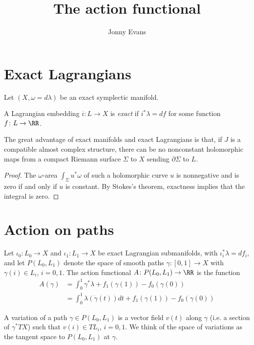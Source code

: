 \documentclass{amsart}
\title{The action functional}
\author{Jonny Evans}
\begin{document}
\section{Exact Lagrangians}

Let $(X,\omega=d\lambda)$ be an exact symplectic manifold.

\begin{Definition}
A Lagrangian embedding $i\colon L\to X$ is {\em exact} if $i^*\lambda=df$ for some function $f\colon L\to\RR$.
\end{Definition}

\begin{Remark}[stokes]
The great advantage of exact manifolds and exact Lagrangians is that, if $J$ is a compatible almost complex structure, there can be no nonconstant holomorphic maps from a compact Riemann surface $\Sigma$ to $X$ sending $\partial\Sigma$ to $L$.
\end{Remark}
\begin{proof}
The $\omega$-area $\int_{\Sigma} u^*\omega$ of such a holomorphic curve $u$ is nonnegative and is zero if and only if $u$ is constant. By Stokes's theorem, exactness implies that the integral is zero.
\end{proof}

\section{Action on paths}

\begin{Definition}
Let $\iota_0\colon L_0\to X$ and $\iota_1\colon L_1\to X$ be exact Lagrangian submanifolds, with $\iota_i^*\lambda=df_i$, and let $P(L_0,L_1)$ denote the space of smooth paths $\gamma\colon[0,1]\to X$ with $\gamma(i)\in L_i$, $i=0,1$. The action functional $A\colon P(L_0,L_1)\to\RR$ is the function
\begin{align*}
A(\gamma)&=\int_0^1\gamma^*\lambda+f_1(\gamma(1))-f_0(\gamma(0))\\
&=\int_0^1\lambda(\dot{\gamma}(t))dt+f_1(\gamma(1))-f_0(\gamma(0))
\end{align*}
\end{Definition}

A variation of a path $\gamma\in P(L_0,L_1)$ is a vector field $v(t)$ along $\gamma$ (i.e. a section of $\gamma^*TX$) such that $v(i)\in TL_i$, $i=0,1$. We think of the space of variations as the tangent space to $P(L_0,L_1)$ at $\gamma$.
\end{document}
